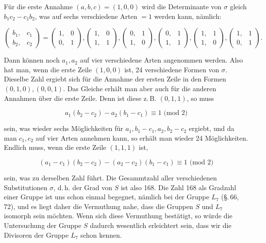
F\"ur die erste Annahme $(a, b, c) = (1, 0, 0)$ wird die Determinante
 von $\sigma$ gleich $b_1 c_2 - c_1 b_2$, was auf sechs verschiedene
Arten $= 1$ werden kann, n\"amlich:

\[
\begin{pmatrix} b_1, & c_1 \\ b_2, & c_2 \end{pmatrix} = \begin{pmatrix} 1, & 0 \\ 0, & 1 \end{pmatrix}, \begin{pmatrix} 1, & 0 \\ 1, & 1 \end{pmatrix}, \begin{pmatrix} 0, & 1 \\ 1, & 0 \end{pmatrix}, \begin{pmatrix} 0, & 1 \\ 1, & 1 \end{pmatrix}, \begin{pmatrix} 1, & 1 \\ 1, & 0 \end{pmatrix}, \begin{pmatrix} 1, & 1 \\ 0, & 1 \end{pmatrix}.
\]

Dann k\"onnen noch $a_1, a_2$ auf vier verschiedene Arten angenommen
 werden. Also hat man, wenn die erste Zeile $(1, 0, 0)$
ist, 24 verschiedene Formen von $\sigma$. Dieselbe Zahl ergiebt sich
f\"ur die Annahme der ersten Zeile in den Formen $(0, 1, 0), (0, 0, 1)$.
Das Gleiche erh\"alt man aber auch f\"ur die anderen Annahmen
\"uber die erste Zeile. Denn ist diese z.\,B. $(0, 1, 1)$, so muss

\[
a_1 (b_2 - c_2) - a_2 (b_1 - c_1) \equiv 1 \text{ (mod 2)}
\]

sein, was wieder sechs M\"oglichkeiten f\"ur $a_1, b_1 - c_1, a_2, b_2 - c_2$
ergiebt, und da man $c_1, c_2$ auf vier Arten annehmen kann, so
erh\"alt man wieder 24 M\"oglichkeiten. Endlich muss, wenn die
erste Zeile $(1, 1, 1)$ ist,

\[
(a_1 - c_1)(b_2 - c_2) - (a_2 - c_2)(b_1 - c_1) \equiv 1 \text{ (mod 2)}
\]

sein, was zu derselben Zahl f\"uhrt. Die Gesammtzahl aller verschiedenen
 Substitutionen $\sigma$, d.\,h. der Grad von $S$ ist also 168.
Die Zahl 168 als Gradzahl einer Gruppe ist uns schon einmal
begegnet, n\"amlich bei der Gruppe $L_7$ (\S.\,66, 72), und es liegt
daher die Vermuthung nahe, dass die Gruppen $S$ und $L_7$
isomorph sein m\"ochten. Wenn sich diese Vermuthung best\"atigt,
so w\"urde die Untersuchung der Gruppe $S$ dadurch wesentlich
 erleichtert sein, dass wir die Divisoren der
Gruppe $L_7$ schon kennen.


